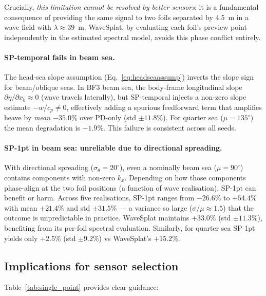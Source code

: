 \documentclass[review]{elsarticle}
\begin{document}
Crucially, \emph{this limitation cannot be resolved by better sensors}:
it is a fundamental consequence of providing the same signal to two foils
separated by 4.5~m in a wave field with $\lambda \approx 39$~m.
WaveSplat, by evaluating each foil's preview point independently in the
estimated spectral model, avoids this phase conflict entirely.

\paragraph{SP-temporal fails in beam sea.}
The head-sea slope assumption (Eq.~\ref{eq:headseaassump}) inverts the
slope sign for beam/oblique seas.  In BF3 beam sea, the body-frame
longitudinal slope $\partial\eta/\partial x_b \approx 0$ (wave travels
laterally), but SP-temporal injects a non-zero slope estimate
$-w/c_p \neq 0$, effectively adding a spurious feedforward term that
amplifies heave by \emph{mean $-35.0\%$} over PD-only (std $\pm 11.8\%$).
For quarter sea ($\mu = 135^\circ$) the mean degradation is $-1.9\%$.
This failure is consistent across all seeds.

\paragraph{SP-1pt in beam sea: unreliable due to directional spreading.}
With directional spreading ($\sigma_\theta = 20^\circ$), even a nominally
beam sea ($\mu = 90^\circ$) contains components with non-zero $k_x$.
Depending on how those components phase-align at the two foil positions
(a function of wave realisation), SP-1pt can benefit or harm.
Across five realisations, SP-1pt ranges from $-26.6\%$ to $+54.4\%$
with mean $+21.4\%$ and std $\pm 31.5\%$ — a variance so large
($\sigma/\mu \approx 1.5$) that the outcome is unpredictable in practice.
WaveSplat maintains $+33.0\%$ (std $\pm 11.3\%$), benefiting from its
per-foil spectral evaluation.  Similarly, for quarter sea SP-1pt yields
only $+2.5\%$ (std $\pm 9.2\%$) vs WaveSplat's $+15.2\%$.

\subsection{Implications for sensor selection}

Table~\ref{tab:single_point} provides clear guidance:
\end{document}
